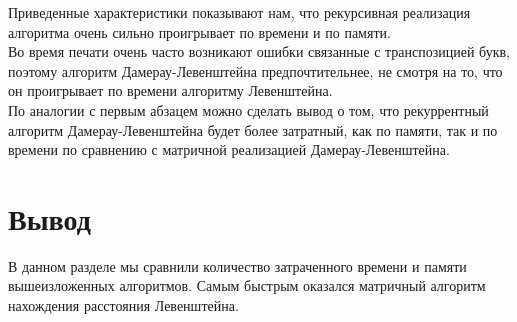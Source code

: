 Приведенные характеристики показывают нам, что рекурсивная реализация алгоритма очень сильно проигрывает по времени и по памяти.\\
Во время печати очень часто возникают ошибки связанные с транспозицией букв, поэтому алгоритм Дамерау-Левенштейна предпочтительнее, не смотря на то, что он проигрывает по времени алгоритму Левенштейна.\\
По аналогии с первым абзацем можно сделать вывод о том, что рекуррентный алгоритм Дамерау-Левенштейна будет более затратный, как по памяти, так и по времени по сравнению с матричной реализацией Дамерау-Левенштейна.

\section{Вывод}

В данном разделе мы сравнили количество затраченного времени и памяти вышеизложенных алгоритмов. Самым быстрым оказался матричный алгоритм нахождения расстояния Левенштейна.


